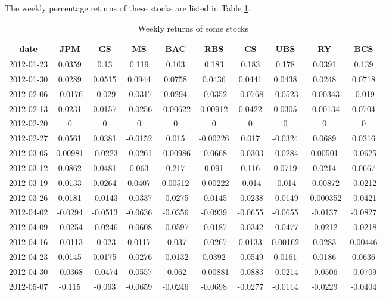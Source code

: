 \documentclass{article}
\DeclareMathOperator{\1}{\mathit{1}}
\numberwithin{figure}{section} %
\numberwithin{table}{section}
\begin{document}
The weekly percentage returns of these stocks are listed in Table \ref{tab:weekly_ret}.

	\begin{table}[hbtp]
	\centering
    \caption{\label{tab:weekly_ret}%
    Weekly returns of some stocks}
    \small
    \begin{tabular}{cccccccccc}
    \hline\hline
\bf{date} & \bf{JPM} & \bf{GS} & \bf{MS} & \bf{BAC} & \bf{RBS} & \bf{CS} & \bf{UBS} & \bf{RY} & \bf{BCS}\\
    \hline
2012-01-23 & 0.0359 & 0.13 & 0.119 & 0.103 & 0.183 & 0.183 & 0.178 & 0.0391 & 0.139\\
2012-01-30 & 0.0289 & 0.0515 & 0.0944 & 0.0758 & 0.0436 & 0.0441 & 0.0438 & 0.0248 & 0.0718\\
2012-02-06 & -0.0176 & -0.029 & -0.0317 & 0.0294 & -0.0352 & -0.0768 & -0.0523 & -0.00343 & -0.019\\
2012-02-13 & 0.0231 & 0.0157 & -0.0256 & -0.00622 & 0.00912 & 0.0422 & 0.0305 & -0.00134 & 0.0704\\
2012-02-20 & 0 & 0 & 0 & 0 & 0 & 0 & 0 & 0 & 0\\
2012-02-27 & 0.0561 & 0.0381 & -0.0152 & 0.015 & -0.00226 & 0.017 & -0.0324 & 0.0689 & 0.0316\\
2012-03-05 & 0.00981 & -0.0223 & -0.0261 & -0.00986 & -0.0668 & -0.0303 & -0.0284 & 0.00501 & -0.0625\\
2012-03-12 & 0.0862 & 0.0481 & 0.063 & 0.217 & 0.091 & 0.116 & 0.0719 & 0.0214 & 0.0667\\
2012-03-19 & 0.0133 & 0.0264 & 0.0407 & 0.00512 & -0.00222 & -0.014 & -0.014 & -0.00872 & -0.0212\\
2012-03-26 & 0.0181 & -0.0143 & -0.0337 & -0.0275 & -0.0145 & -0.0238 & -0.0149 & -0.000352 & -0.0421\\
2012-04-02 & -0.0294 & -0.0513 & -0.0636 & -0.0356 & -0.0939 & -0.0655 & -0.0655 & -0.0137 & -0.0827\\
2012-04-09 & -0.0254 & -0.0246 & -0.0608 & -0.0597 & -0.0187 & -0.0342 & -0.0477 & -0.0212 & -0.0218\\
2012-04-16 & -0.0113 & -0.023 & 0.0117 & -0.037 & -0.0267 & 0.0133 & 0.00162 & 0.0283 & 0.00446\\
2012-04-23 & 0.0145 & 0.0175 & -0.0276 & -0.0132 & 0.0392 & -0.0549 & 0.0161 & 0.0186 & 0.0636\\
2012-04-30 & -0.0368 & -0.0474 & -0.0557 & -0.062 & -0.00881 & -0.0883 & -0.0214 & -0.0506 & -0.0709\\
2012-05-07 & -0.115 & -0.063 & -0.0659 & -0.0246 & -0.0698 & -0.0277 & -0.0114 & -0.0229 & -0.0404\\

\end{tabular}
\end{table}
\end{document}
